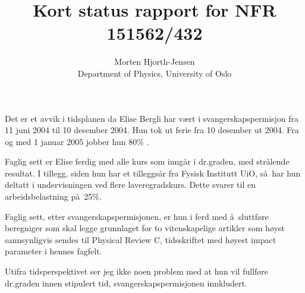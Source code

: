 \documentclass{article}
\begin{document}
\title{Kort status rapport for NFR 151562/432}

\author{Morten Hjorth-Jensen\\ Department of Physics, University of Oslo} 

\maketitle  

Det er et avvik i tidsplanen da Elise Bergli har v\ae rt i svangerskapspermisjon
fra 11 juni 2004 til 10 desember 2004. Hun tok ut ferie fra 10 desember ut 2004.
Fra og med 1 januar 2005 jobber hun 80\% . 

Faglig sett er Elise ferdig med alle kurs som inng\aa r i dr.graden, med str\aa lende
resultat. I tillegg, siden hun har et tilleggs\aa r fra Fysisk Institutt UiO, s\aa\ har hun deltatt i undervisningen ved flere laveregradskurs. Dette svarer til en arbeidsbelastning p\aa\ 25\%. 

Faglig sett, etter svangerskapspermisjonen, er hun i ferd med \aa\ sluttf\o re beregniger som skal legge grunnlaget for to vitenskapelige artikler som h\o yst sannsynligvis sendes
til  Physical Review C, tidsskriftet med h\o yest
impact parameter i hennes fagfelt.

Utifra tidsperspektivet ser jeg ikke noen problem med at hun vil fullf\o re dr.graden
innen stipulert tid, svangerskapspermisjonen innkludert.
\end{document}
